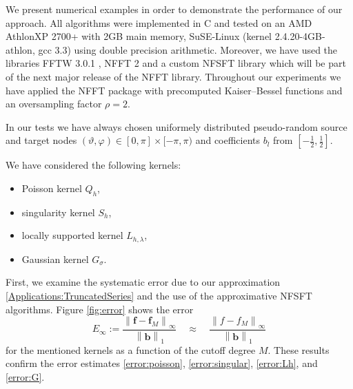 \documentclass[11pt,a4paper,twoside,bibtotoc]{scrartcl}
\theoremstyle{plain}
\theoremstyle{definition}
\theoremstyle{remark}
\newcommand{\paren}[1]{\ensuremath{\left(#1\right)}}
\newcommand{\mb}[1]{\mathbf{#1}}
\newcommand{\V}[1]{\mb{#1}}
\numberwithin{equation}{section}
\numberwithin{table}{section}
\numberwithin{figure}{section}
\begin{document}
We present numerical examples in order to demonstrate the performance of
our approach. All algorithms were implemented in C and tested on an 
AMD Athlon\texttrademark XP 2700+ with 2GB main memory, SuSE-Linux 
(kernel 2.4.20-4GB-athlon, gcc 3.3) using double precision arithmetic. 
Moreover, we have used the libraries FFTW 3.0.1 \cite{fftw}, NFFT 2
\cite{kupo02C} and a custom NFSFT library which will be part of the next 
major release of the NFFT library. Throughout our experiments we have 
applied the NFFT package \cite{kupo02C} with precomputed Kaiser--Bessel 
functions and an oversampling factor $\rho=2$.

In our tests we have always chosen uniformely distributed pseudo-random 
source and target nodes 
$\paren{\vartheta,\varphi} \in [0,\pi] \times [-\pi,\pi)$ and 
coefficients $b_l$ from $\left[-\frac{1}{2},\frac{1}{2}\right]$.

We have considered the following kernels:

\begin{itemize}
  \item Poisson kernel $Q_{h}$,
  \item singularity kernel $S_{h}$,
  \item locally supported kernel $L_{h,\lambda}$,
  \item Gaussian kernel $G_{\sigma}$.
\end{itemize}

First, we examine the systematic error due to our approximation
\eqref{Applications:TruncatedSeries} and the use of the approximative NFSFT
algorithms. Figure \ref{fig:error} shows the error
\[
E_{\infty}:=
\frac{\left\|\V{f}-\V{f}_M\right\|_{\infty}}{\left\|\V{b}\right\|_{1}}
\quad \approx \quad \frac{\left\|f-f_M\right\|_{\infty}}{\left\|\V{b}\right\|_{1}}
\]
for the mentioned kernels as a function of the cutoff degree $M$.
These results confirm the error estimates \eqref{error:poisson},
\eqref{error:singular}, \eqref{error:Lh}, and \eqref{error:G}.
\end{document}
